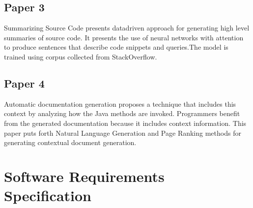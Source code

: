 \documentclass[oneside,a4paper,12pt, times]{book}
\begin{document}
\section{Paper 3}
Summarizing Source Code\cite{iyer2016summarizing} presents datadriven
approach for generating high level
summaries of source code. It presents the use of neural networks with attention to
produce sentences that describe code snippets and queries.The model is trained using corpus
collected from StackOverflow.
\section{Paper 4}
Automatic documentation generation \cite{mcburney2014automatic} proposes a technique that includes this context by analyzing
how the Java methods are invoked. Programmers benefit from the generated documentation
because it includes context information. This paper puts forth Natural Language Generation and Page Ranking methods for generating contextual document generation.
\vskip 10cm

			
\chapter{Software Requirements Specification}
\end{document}
